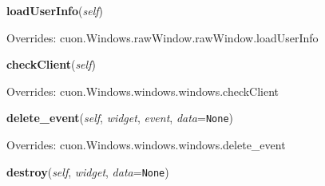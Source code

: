 \hspace{.8\funcindent}\begin{boxedminipage}{\funcwidth}

    \raggedright \textbf{loadUserInfo}(\textit{self})

\setlength{\parskip}{2ex}
\setlength{\parskip}{1ex}
      Overrides: cuon.Windows.rawWindow.rawWindow.loadUserInfo

    \end{boxedminipage}

    \vspace{0.5ex}

\hspace{.8\funcindent}\begin{boxedminipage}{\funcwidth}

    \raggedright \textbf{checkClient}(\textit{self})

\setlength{\parskip}{2ex}
\setlength{\parskip}{1ex}
      Overrides: cuon.Windows.windows.windows.checkClient

    \end{boxedminipage}

    \vspace{0.5ex}

\hspace{.8\funcindent}\begin{boxedminipage}{\funcwidth}

    \raggedright \textbf{delete\_event}(\textit{self}, \textit{widget}, \textit{event}, \textit{data}={\tt None})

\setlength{\parskip}{2ex}
\setlength{\parskip}{1ex}
      Overrides: cuon.Windows.windows.windows.delete\_event

    \end{boxedminipage}

    \label{Cuon:MainWindow:destroy}

    \vspace{0.5ex}

\hspace{.8\funcindent}\begin{boxedminipage}{\funcwidth}

    \raggedright \textbf{destroy}(\textit{self}, \textit{widget}, \textit{data}={\tt None})

\setlength{\parskip}{2ex}
\setlength{\parskip}{1ex}
    \end{boxedminipage}


